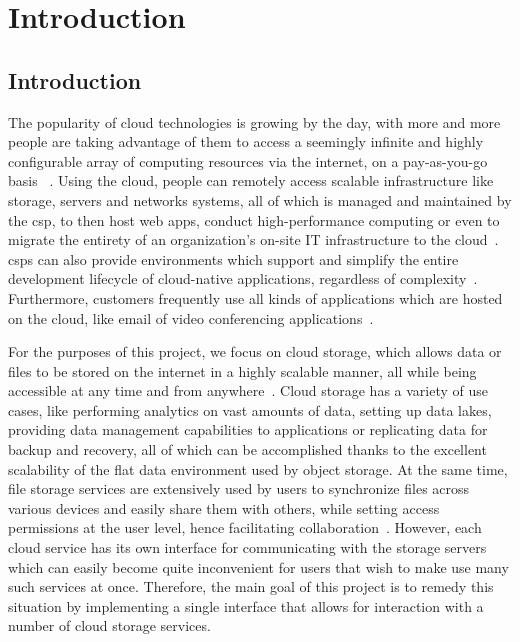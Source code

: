 \tableofcontents

\chapter{Introduction}

\section{Introduction}
The popularity of cloud technologies is growing by the day, with more and more people are taking advantage of them to access a seemingly infinite and highly configurable array of computing resources via the internet, on a pay-as-you-go basis ~\cite{gvr}. Using the cloud, people can remotely access scalable infrastructure like storage, servers and networks systems, all of which is managed and maintained by the \ac{csp}, to then host web apps, conduct high-performance computing or even to migrate the entirety of an organization's on-site IT infrastructure to the cloud~\cite{iaas}. \ac{csp}s can also provide environments which support and simplify the entire development lifecycle of cloud-native applications, regardless of complexity~\cite{paas}. Furthermore, customers frequently use all kinds of applications which are hosted on the cloud, like email of video conferencing applications~\cite{saas}.

For the purposes of this project, we focus on cloud storage, which allows data or files to be stored on the internet in a highly scalable manner, all while being accessible at any time and from anywhere~\cite{s3_cloud_storage}. Cloud storage has a variety of use cases, like performing analytics on vast amounts of data, setting up data lakes, providing data management capabilities to applications or replicating data for backup and recovery, all of which can be accomplished thanks to the excellent scalability of the flat data environment used by object storage. At the same time, file storage services are extensively used by users to synchronize files across various devices and easily share them with others, while setting access permissions at the user level, hence facilitating collaboration~\cite{objectvsfile,objectvsfile2}. However, each cloud service has its own interface for communicating with the storage servers which can easily become quite inconvenient for users that wish to make use many such services at once. Therefore, the main goal of this project is to remedy this situation by implementing a single interface that allows for interaction with a number of cloud storage services.

